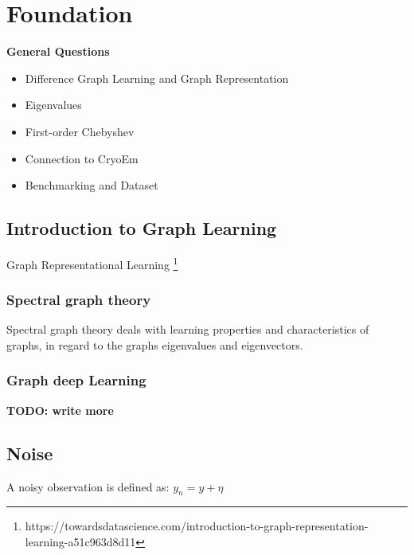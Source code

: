 
\chapter{Foundation}



\textbf{General Questions}
\begin{itemize}
    \item Difference Graph Learning and Graph Representation
    \item Eigenvalues
    \item First-order Chebyshev
    \item Connection to CryoEm
    \item Benchmarking and Dataset
\end{itemize}

\section{Introduction to Graph Learning}

Graph Representational Learning
\footnote{https://towardsdatascience.com/introduction-to-graph-representation-learning-a51c963d8d11}


\subsection{Spectral graph theory}
Spectral graph theory \cite{SpectralGraphTheory} deals with learning properties and characteristics of graphs, in regard to
the graphs eigenvalues and eigenvectors. 

\subsection{Graph deep Learning}

\textbf{TODO: write more}


\section{Noise}
A noisy observation is defined as:
$y_n = y + \eta$

